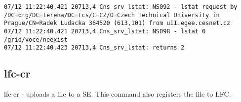 \documentclass[a4paper, 11pt]{article} %
\begin{document}
\begin{lstlisting}[label={log:lfcls3},caption={lfc-ls /grid/voce/neexist - query to file that does not exists}]
07/12 11:22:40.421 20713,4 Cns_srv_lstat: NS092 - lstat request by /DC=org/DC=terena/DC=tcs/C=CZ/O=Czech Technical University in Prague/CN=Radek Ludacka 364520 (613,101) from ui1.egee.cesnet.cz
07/12 11:22:40.421 20713,4 Cns_srv_lstat: NS098 - lstat 0 /grid/voce/neexist
07/12 11:22:40.423 20713,4 Cns_srv_lstat: returns 2
\end{lstlisting}

\subsection{lfc-cr}

lfc-cr - uploads a file to a SE. This command also registers the file to LFC. 
\end{document}
